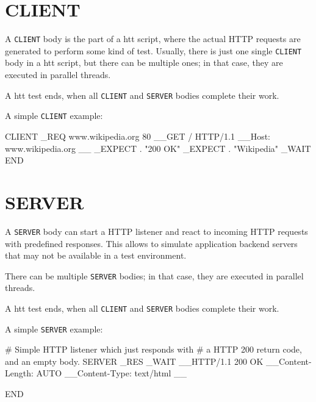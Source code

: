 
\newpage
\section{CLIENT}
\label{chap:client}

A \texttt{CLIENT} body is the part of a htt script, where the actual HTTP requests 
are generated to perform some kind of test. Usually, there is just one single 
\texttt{CLIENT} body in a htt script, but there can be multiple ones; in that case, 
they are executed in parallel threads.

A htt test ends, when all \texttt{CLIENT} and \texttt{SERVER} bodies complete their work.

A simple \texttt{CLIENT} example:

\begin{usplisting}
    CLIENT
    _REQ www.wikipedia.org 80
    __GET / HTTP/1.1
    __Host: www.wikipedia.org
    __
    _EXPECT . "200 OK"
    _EXPECT . "Wikipedia"
    _WAIT
    END
\end{usplisting}



\newpage
\section{SERVER}
\label{chap:server}

A \texttt{SERVER} body can start a HTTP listener and react to incoming HTTP 
requests with predefined responses. This allows to simulate application 
backend servers that may not be available in a test environment. 

There can be multiple \texttt{SERVER} bodies; in that case, 
they are executed in parallel threads.

A htt test ends, when all \texttt{CLIENT} and \texttt{SERVER} bodies complete their work.

A simple \texttt{SERVER} example:

\begin{usplisting}
    # Simple HTTP listener which just responds with
    # a HTTP 200 return code, and an empty body.
    SERVER
    _RES
    _WAIT
    __HTTP/1.1 200 OK
    __Content-Length: AUTO
    __Content-Type: text/html
    __

    END
\end{usplisting}


